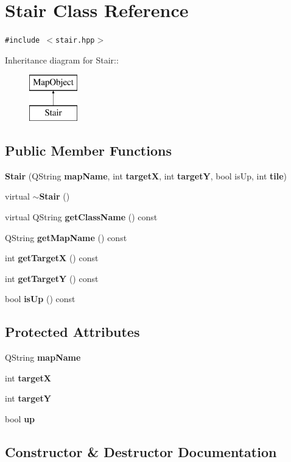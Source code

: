 \section{Stair Class Reference}
\label{classStair}
{\tt \#include $<$stair.hpp$>$}

Inheritance diagram for Stair::\begin{figure}[H]
\begin{center}
\leavevmode
\includegraphics[height=2cm]{classStair}
\end{center}
\end{figure}
\subsection*{Public Member Functions}
\begin{CompactItemize}
\item 
{\bf Stair} (QString {\bf map\-Name}, int {\bf target\-X}, int {\bf target\-Y}, bool is\-Up, int {\bf tile})
\item 
virtual {\bf $\sim$Stair} ()
\item 
virtual QString {\bf get\-Class\-Name} () const 
\item 
QString {\bf get\-Map\-Name} () const 
\item 
int {\bf get\-Target\-X} () const 
\item 
int {\bf get\-Target\-Y} () const 
\item 
bool {\bf is\-Up} () const 
\end{CompactItemize}
\subsection*{Protected Attributes}
\begin{CompactItemize}
\item 
QString {\bf map\-Name}
\item 
int {\bf target\-X}
\item 
int {\bf target\-Y}
\item 
bool {\bf up}
\end{CompactItemize}


\subsection{Constructor \& Destructor Documentation}
